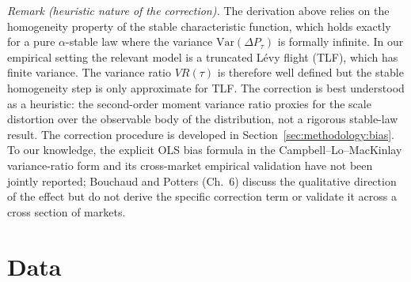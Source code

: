 \documentclass[conference]{IEEEtran}
\begin{document}
\textit{Remark (heuristic nature of the correction).}
The derivation above relies on the homogeneity property of the stable
characteristic function, which holds exactly for a pure $\alpha$-stable
law where the variance $\mathrm{Var}(\Delta P_\tau)$ is formally infinite.
In our empirical setting the relevant model is a truncated Lévy flight (TLF),
which has finite variance. The variance ratio $VR(\tau)$ is therefore
well defined but the stable homogeneity step is only approximate for TLF.
The correction is best understood as a heuristic: the second-order moment
variance ratio proxies for the scale distortion over the observable body of
the distribution, not a rigorous stable-law result.
The correction
procedure is developed in Section~\ref{sec:methodology:bias}. To our knowledge, the explicit OLS bias formula in the
Campbell--Lo--MacKinlay variance-ratio form and its cross-market empirical
validation have not been jointly reported; Bouchaud and Potters \cite{BouchaudPotters2003}
(Ch.~6) discuss the qualitative direction of the effect but do not derive
the specific correction term or validate it across a cross section of markets.


\section{Data}
\label{sec:data}
\end{document}
